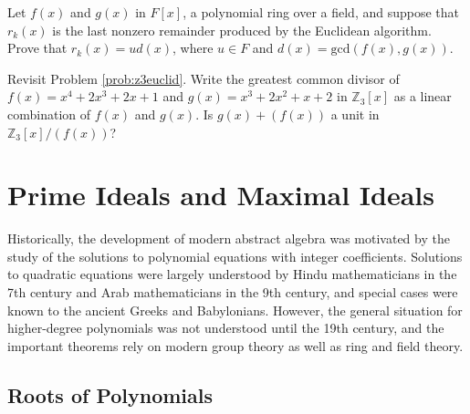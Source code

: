 \begin{problem}\label{prob:eucalgpf4}
Let \(f(x)\) and \(g(x)\) in \(F[x]\), a polynomial ring over a field, and suppose that \(r_k(x)\) is the last nonzero remainder produced by the Euclidean algorithm. Prove that \(r_k(x) = ud(x)\), where \(u \in F\) and \(d(x)=\mbox{gcd}(f(x),g(x))\).
\begin{annotation}
\end{annotation}
\end{problem}


\begin{problem}\label{prob:backsub2}
Revisit Problem \ref{prob:z3euclid}. Write the greatest common divisor of \(f(x)=x^4+2x^3+2x+1\) and \(g(x) = x^3+2x^2+x+2\) in \(\mathbb{Z}_3[x]\) as a linear combination of \(f(x)\) and \(g(x)\). Is \(g(x)+(f(x))\) a unit in \(\mathbb{Z}_3[x]/(f(x))\)?
\end{problem}

\chapter{Prime Ideals and Maximal Ideals}\label{chap:primemax}

Historically, the development of modern abstract algebra was motivated by the study of the solutions to polynomial equations with integer coefficients. Solutions to quadratic equations were largely understood by Hindu mathematicians in the 7th century and Arab mathematicians in the 9th century, and special cases were known to the ancient Greeks and Babylonians. However, the general situation for higher-degree polynomials was not understood until the 19th century, and the important theorems rely on modern group theory as well as ring and field theory.
\begin{annotation}
\end{annotation}

\section{Roots of Polynomials}

